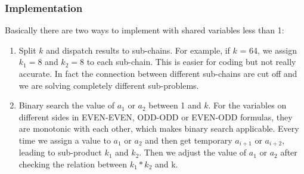 \subsubsection{Implementation}
Basically there are two ways to implement with shared variables less than 1:
\begin{enumerate}
\item Split $k$ and dispatch results to sub-chains. For example, if $k$ = 64, we assign $k_1 = 8$ and $k_2 = 8$ to each sub-chain. This is easier for coding but not really accurate. In fact the connection between different sub-chains are cut off and we are solving completely different sub-problems.
\item Binary search the value of $a_1$ or $a_2$ between 1 and $k$. For the variables on different sides in EVEN-EVEN, ODD-ODD or EVEN-ODD formulas, they are monotonic with each other, which makes binary search applicable. Every time we assign a value to $a_1$ or $a_2$ and then get temporary $a_{i+1}$ or $a_{i+2}$, leading to sub-product $k_1$ and $k_2$. Then we adjust the value of $a_1$ or $a_2$ after checking the relation between $k_1*k_2$ and k.
\end{enumerate}
